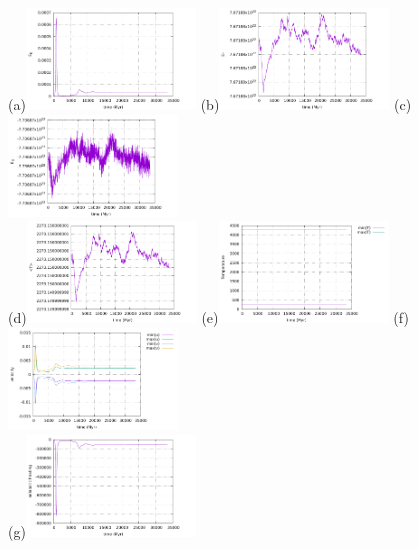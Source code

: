 \begin{center}
(a)\includegraphics[width=4.5cm]{python_codes/fieldstone_compressible2/BA_105/EK}
(b)\includegraphics[width=4.5cm]{python_codes/fieldstone_compressible2/BA_105/ET}
(c)\includegraphics[width=4.5cm]{python_codes/fieldstone_compressible2/BA_105/EG}\\
(d)\includegraphics[width=4.5cm]{python_codes/fieldstone_compressible2/BA_105/Tavrg}
(e)\includegraphics[width=4.5cm]{python_codes/fieldstone_compressible2/BA_105/T_stats}
(f)\includegraphics[width=4.5cm]{python_codes/fieldstone_compressible2/BA_105/vel_stats}\\
(g)\includegraphics[width=4.5cm]{python_codes/fieldstone_compressible2/BA_105/adiabatic_heating}

\end{center}
